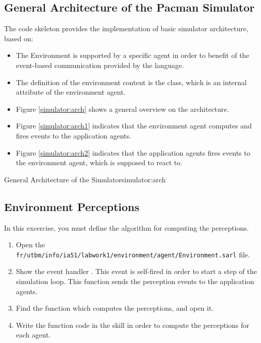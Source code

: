 \documentclass[article,english,nodocumentinfo]{multiagentfrreport}
\begin{document}
\subsection{General Architecture of the Pacman Simulator}

The code skeleton provides the implementation of basic simulator architecture, based on:
\begin{itemize}
\item The Environment is supported by a specific agent in order to benefit of the event-based communication provided by the \sarl language.
\item The definition of the environment content is the  class, which is an internal attribute of the environment agent.
\item Figure \ref{simulator:arch} shows a general overview on the architecture.
\item Figure \ref{simulator:arch1} indicates that the environment agent computes and fires  events to the application agents.
\item Figure \ref{simulator:arch2} indicates that the application agents fires  events to the environment agent, which is supposed to react to.
\end{itemize}

\begin{mfigures}{General Architecture of the Simulator}{simulator:arch}
	\hspace{1cm}
\end{mfigures}

\subsection{Environment Perceptions}

In this excercise, you must define the algorithm for computing the perceptions.
\begin{enumerate}
\item Open the \texttt{fr/utbm/info/ia51/labwork1/environment/agent/Environment.sarl} file.
\item Show the event handler . This event is self-fired in order to start a step of the simulation loop. This function sends the perception events to the application agents.
\item Find the function which computes the perceptions, and open it.
\item Write the function code in the skill in order to compute the perceptions for each agent.
\end{enumerate}
\end{document}
